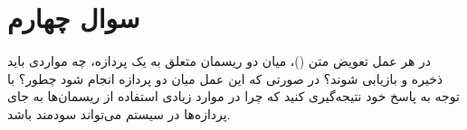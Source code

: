 \section{سوال چهارم}

در هر عمل تعویض متن ()، میان دو ریسمان متعلق به یک پردازه، چه مواردی باید ذخیره و بازیابی شوند؟ در صورتی که این عمل میان دو پردازه انجام شود چطور؟ با توجه به پاسخ خود نتیجه‌گیری کنید که چرا در موارد زیادی استفاده از ریسمان‌ها به جای پردازه‌ها در سیستم می‌تواند سودمند باشد.

\begin{qsolve}
	
\end{qsolve}